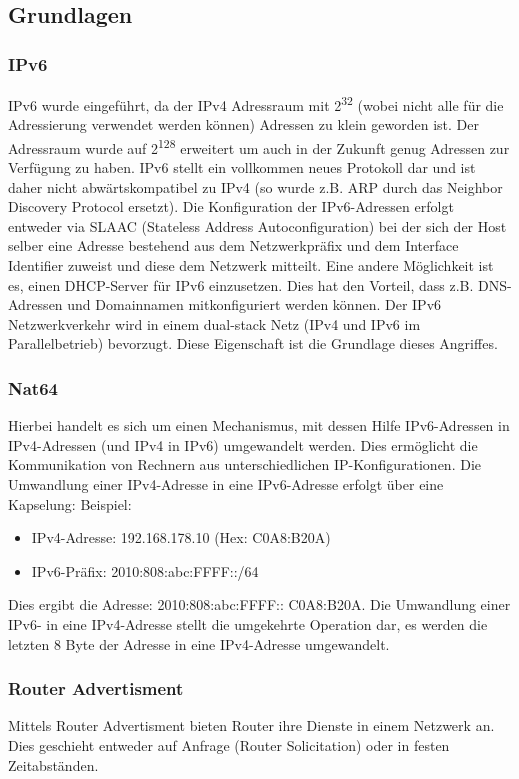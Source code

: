 \subsection*{Grundlagen}

\subsubsection*{IPv6}
IPv6 wurde eingeführt, da der IPv4 Adressraum mit 2\textsuperscript{32} (wobei nicht alle für die Adressierung verwendet werden können) Adressen zu klein geworden ist. Der Adressraum wurde auf 2\textsuperscript{128} erweitert um auch in der Zukunft genug Adressen zur Verfügung zu haben. IPv6 stellt ein vollkommen neues Protokoll dar und ist daher nicht abwärtskompatibel zu IPv4 (so wurde z.B. ARP durch das Neighbor Discovery Protocol ersetzt). 
Die Konfiguration der IPv6-Adressen erfolgt entweder via SLAAC (Stateless Address Autoconfiguration) bei der sich der Host selber eine Adresse bestehend aus dem Netzwerkpräfix und dem Interface Identifier zuweist und diese dem Netzwerk mitteilt. Eine andere Möglichkeit ist es, einen DHCP-Server für IPv6 einzusetzen. Dies hat den Vorteil, dass z.B. DNS-Adressen und Domainnamen mitkonfiguriert werden können.
Der IPv6 Netzwerkverkehr wird in einem dual-stack Netz (IPv4 und IPv6 im Parallelbetrieb) bevorzugt. Diese Eigenschaft ist die Grundlage dieses Angriffes.

\subsubsection*{Nat64}
Hierbei handelt es sich um einen Mechanismus, mit dessen Hilfe IPv6-Adressen in IPv4-Adressen (und IPv4 in IPv6) umgewandelt werden. Dies ermöglicht die Kommunikation von Rechnern aus unterschiedlichen IP-Konfigurationen. 
Die Umwandlung einer IPv4-Adresse in eine IPv6-Adresse erfolgt über eine Kapselung:
Beispiel:
\begin{itemize}
	\item IPv4-Adresse: 192.168.178.10 (Hex: C0A8:B20A)
	\item IPv6-Präfix: 2010:808:abc:FFFF::/64
\end{itemize}
Dies ergibt die Adresse: 2010:808:abc:FFFF:: C0A8:B20A. Die Umwandlung einer IPv6- in eine IPv4-Adresse stellt die umgekehrte Operation dar, es werden die letzten 8 Byte der Adresse in eine IPv4-Adresse umgewandelt.

\subsubsection*{Router Advertisment}
Mittels Router Advertisment bieten Router ihre Dienste in einem Netzwerk an. Dies geschieht entweder auf Anfrage (Router Solicitation) oder in festen Zeitabständen.

